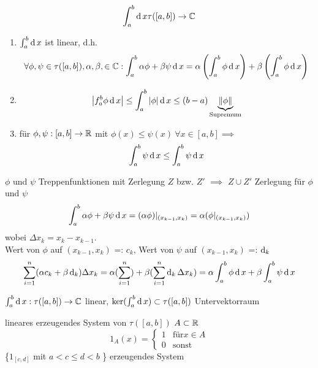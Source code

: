\begin{Lem}{}
  \begin{align*}
    \int_a^b \operatorname{d} x \tau([a,b])\to\mathbb{C}
  \end{align*}
  \begin{enumerate}
    \item $\int_a^b \operatorname{d} x$ ist linear, d.h.
      \[\forall \phi, \psi\in\tau([a,b]),\alpha, \beta, \in\mathbb{C}: \int_a^b\alpha\phi+\beta\psi \operatorname{d} x = \alpha\left( \int^b_a\phi \operatorname{d} x \right)+\beta\left( \int^b_a\phi \operatorname{d} x \right)\]
    \item \[\left| f^b_a\phi \operatorname{d} x \right|\leq \int^b_a\left| \phi \right| \operatorname{d} x \leq (b-a) \underbrace{\left\| \phi \right\|}_{\text{Supremum}}\]
    \item für $\phi,\psi:[a,b]\to\mathbb{R}$ mit $\phi(x)\leq\psi(x)\ \forall x\in[a,b] \implies$
      \[\int^b_a\psi \operatorname{d} x \leq \int^b_a \psi \operatorname{d} x\]
  \end{enumerate}
\end{Lem}
\begin{Bew}
  $\phi$ und $\psi$ Treppenfunktionen mit Zerlegung $Z$ bzw. $Z'$ $\implies$ $Z\cup Z'$ Zerlegung für $\phi$ und $\psi$
  \[\int^b_a\alpha\phi+\beta\psi \operatorname{d} x = (\alpha\phi)|_{(x_{k-1},x_k)}=\alpha(\phi|_{(x_{k-1},x_k)})\]
  wobei $\Delta x_k=x_k-x_{k-1}$.\\
  Wert von $\phi$ auf $(x_{k-1},x_k)$ =: $c_k$, Wert von $\psi$ auf $(x_{k-1},x_k)$ =: $\operatorname{d}_k$
  \[\sum^n_{i=1}(\alpha c_k+\beta \operatorname{d}_k)\Delta x_k=\alpha(\sum^n_{i=1})+\beta(\sum^n_{i=1}\operatorname{d}_k\Delta x_k)=\alpha\int^b_a \phi \operatorname{d} x+\beta \int^b_a \psi \operatorname{d} x\]
\end{Bew}
\begin{Bem}
  $\int^b_a \operatorname{d} x: \tau([a,b])\to\mathbb{C}$ linear, $\ker(\int_a^b \operatorname{d} x) \subset \tau([a,b])$ Untervektorraum
\end{Bem}
\begin{Bem}
  lineares erzeugendes System von $\tau([a,b])$ $A\subset\mathbb{R}$
  \[1_A(x) = \begin{cases}1&\text{für} x\in A\\0&\text{sonst}\end{cases}\]
  \{$1_{[c,d]}$ mit $a<c\leq d<b$ \} erzeugendes System
\end{Bem}
